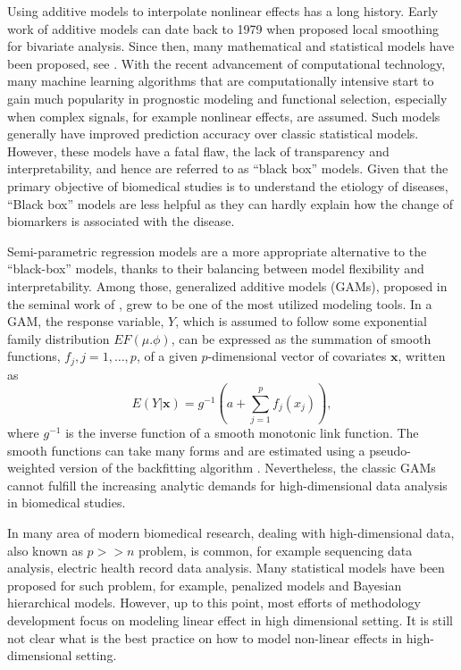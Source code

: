 \documentclass[AMA,STIX1COL,]{WileyNJD-v2}
\begin{document}
Using additive models to interpolate nonlinear effects has a long
history. Early work of additive models can date back to 1979 when
\citet{Cleveland1979} proposed local smoothing for bivariate analysis.
Since then, many mathematical and statistical models have been proposed,
see \citet{Wood2020}. With the recent advancement of computational
technology, many machine learning algorithms that are computationally
intensive start to gain much popularity in prognostic modeling and
functional selection, especially when complex signals, for example
nonlinear effects, are assumed. Such models generally have improved
prediction accuracy over classic statistical models. However, these
models have a fatal flaw, the lack of transparency and interpretability,
and hence are referred to as ``black box'' models. Given that the
primary objective of biomedical studies is to understand the etiology of
diseases, ``Black box'' models are less helpful as they can hardly
explain how the change of biomarkers is associated with the disease.

Semi-parametric regression models are a more appropriate alternative to
the ``black-box'' models, thanks to their balancing between model
flexibility and interpretability. Among those, generalized additive
models (GAMs), proposed in the seminal work of \citet{Hastie1987}, grew
to be one of the most utilized modeling tools. In a GAM, the response
variable, \(Y\), which is assumed to follow some exponential family
distribution \(EF(\mu. \phi)\), can be expressed as the summation of
smooth functions, \(f_j, j = 1, \dots, p\), of a given \(p\)-dimensional
vector of covariates \(\boldsymbol{x}\), written as \[
E(Y|\boldsymbol{x}) = g^{-1}(a + \sum\limits^p_{j=1}f_j(x_j)),
\] where \(g^{-1}\) is the inverse function of a smooth monotonic link
function. The smooth functions can take many forms and are estimated
using a pseudo-weighted version of the backfitting algorithm
\citep{Breiman1985}. Nevertheless, the classic GAMs cannot fulfill the
increasing analytic demands for high-dimensional data analysis in
biomedical studies.

In many area of modern biomedical research, dealing with
high-dimensional data, also known as \(p >> n\) problem, is common, for
example sequencing data analysis, electric health record data analysis.
Many statistical models have been proposed for such problem, for
example, penalized models and Bayesian hierarchical models. However, up
to this point, most efforts of methodology development focus on modeling
linear effect in high dimensional setting. It is still not clear what is
the best practice on how to model non-linear effects in high-dimensional
setting.
\end{document}
